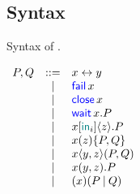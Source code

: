 \section{\Calculus}
\label{sec:calculus}

\subsection{Syntax}
\label{sec:syntax}

\begin{table}
    \caption{Syntax of \Calculus.}
    \label{tab:syntax}
    \begin{math}
        \displaystyle
        \begin{array}[t]{rcll}
            P, Q & ::= & \Link\x\y \\
                & | & \Fail\x \\
                & | & \Close\x \\
                & | & \Wait\x.P \\
                & | & \Select\x{\InTag_i}\z.P \\
                & | & \Case\x\z{P}{Q} \\
                & | & \Fork\x\y\z{P}{Q} \\
                & | & \Join\x\y\z.P \\
                & | & \Cut\x{P}{Q} \\
        \end{array}
    \end{math}
\end{table}

